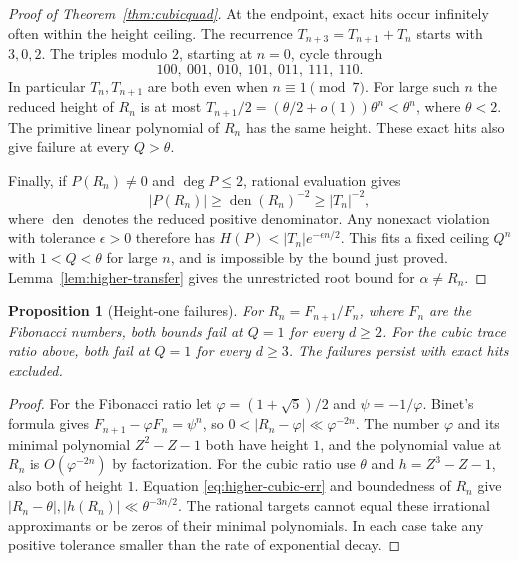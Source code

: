 \documentclass[11pt,a4paper,reqno]{amsart}
\newtheorem{proposition}[theorem]{Proposition}
\theoremstyle{definition}
\theoremstyle{remark}
\numberwithin{equation}{section}
\begin{document}
\begin{proof}[Proof of Theorem~\ref{thm:cubicquad}]
At the endpoint, exact hits occur infinitely
often within the height ceiling. The recurrence
\(T_{n+3}=T_{n+1}+T_n\) starts with \(3,0,2\).
The triples modulo \(2\), starting at \(n=0\),
cycle through
\[
 100,\ 001,\ 010,\ 101,\ 011,\ 111,\ 110 .
\]
In particular \(T_n,T_{n+1}\) are both even when
\(n\equiv1\pmod7\). For large such \(n\) the
reduced height of \(R_n\) is at most
\(T_{n+1}/2=(\theta/2+o(1))\theta^n<\theta^n\),
where \(\theta<2\). The primitive linear
polynomial of \(R_n\) has the same height.
These exact hits also give failure at every \(Q>\theta\).

Finally, if \(P(R_n)\ne0\) and \(\deg P\le2\),
rational evaluation gives
\[
 |P(R_n)|\ge \operatorname{den}(R_n)^{-2}
             \ge |T_n|^{-2},
\]
where \(\operatorname{den}\) denotes the reduced
positive denominator. Any nonexact violation
with tolerance \(\epsilon>0\) therefore has
\(H(P)<|T_n|e^{-\epsilon n/2}\).
This fits a fixed ceiling \(Q^n\) with \(1<Q<\theta\)
for large \(n\), and is impossible by the bound
just proved. Lemma~\ref{lem:higher-transfer} gives
the unrestricted root bound for \(\alpha\ne R_n\).
\end{proof}

\begin{proposition}[Height-one failures]\label{prop:higher-height-one}
For \(R_n=F_{n+1}/F_n\), where \(F_n\) are the Fibonacci
numbers, both bounds fail at \(Q=1\) for every \(d\ge2\).
For the cubic trace ratio above, both fail at \(Q=1\)
for every \(d\ge3\). The failures persist with exact
hits excluded.
\end{proposition}

\begin{proof}
For the Fibonacci ratio let
\(\varphi=(1+\sqrt5)/2\) and \(\psi=-1/\varphi\).
Binet's formula gives \(F_{n+1}-\varphi F_n=\psi^n\),
so \(0<|R_n-\varphi|\ll\varphi^{-2n}\). The number
\(\varphi\) and its minimal polynomial \(Z^2-Z-1\)
both have height \(1\), and the polynomial value
at \(R_n\) is \(O(\varphi^{-2n})\) by factorization.
For the cubic ratio use \(\theta\) and \(h=Z^3-Z-1\),
also both of height \(1\). Equation
\eqref{eq:higher-cubic-err} and boundedness of \(R_n\)
give \(|R_n-\theta|,|h(R_n)|\ll\theta^{-3n/2}\).
The rational targets cannot equal these irrational
approximants or be zeros of their minimal polynomials.
In each case take any positive tolerance smaller
than the rate of exponential decay.
\end{proof}
\end{document}
